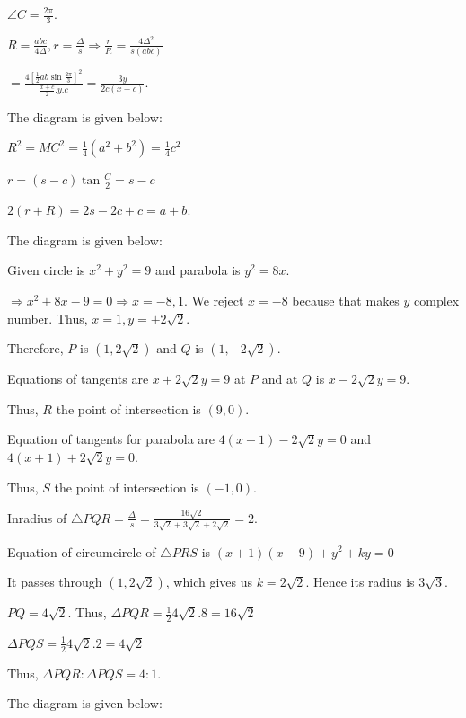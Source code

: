   $\angle C = \frac{2\pi}{3}$.

  $R = \frac{abc}{4\Delta}, r = \frac{\Delta}{s}\Rightarrow \frac{r}{R} = \frac{4\Delta^2}{s(abc)}$

  $= \frac{4\left[\frac{1}{2}ab\sin\frac{2\pi}{3}\right]^2}{\frac{x + c}{2}.y.c} = \frac{3y}{2c(x + c)}$.
\item The diagram is given below:

  \startplacefigure
    \externalfigure[17_21.pdf]
  \stopplacefigure

  $R^2 = MC^2 = \frac{1}{4}(a^2 + b^2) = \frac{1}{4}c^2$

  $r = (s - c)\tan\frac{C}{2}= s - c$

  $2(r + R) = 2s - 2c + c = a + b$.
\item The diagram is given below:

  \startplacefigure
    \externalfigure[17_22.pdf]
  \stopplacefigure

  Given circle is $x^2 + y^2 = 9$ and parabola is $y^2 = 8x$.

  $\Rightarrow x^2 + 8x - 9 = 0 \Rightarrow x = -8, 1$. We reject $x = -8$ because that makes $y$ complex
  number. Thus, $x = 1, y = \pm2\sqrt{2}$.

  Therefore, $P$ is $\left(1, 2\sqrt{2}\right)$ and $Q$ is $\left(1, -2\sqrt{2}\right)$.

  Equations of tangents are $x + 2\sqrt{2}y = 9$ at $P$ and at $Q$ is $x - 2\sqrt{2}y = 9$.

  Thus, $R$ the point of intersection is $(9, 0)$.

  Equation of tangents for parabola are $4(x + 1) - 2\sqrt{2}y = 0$ and $4(x + 1) + 2\sqrt{2}y = 0$.

  Thus, $S$ the point of intersection is $(-1, 0)$.

  Inradius of $\triangle PQR = \frac{\Delta}{s} = \frac{16\sqrt{2}}{3\sqrt{2} + 3\sqrt{2} + 2\sqrt{2}} = 2$.

  Equation of circumcircle of $\triangle PRS$ is $(x + 1)(x - 9) + y^2 + ky = 0$

  It passes through $\left(1, 2\sqrt{2}\right)$, which gives us $k = 2\sqrt{2}$. Hence its radius is
  $3\sqrt{3}$.

  $PQ = 4\sqrt{2}$. Thus, $\Delta PQR = \frac{1}{2}4\sqrt{2}.8 = 16\sqrt{2}$

  $\Delta PQS = \frac{1}{2}4\sqrt{2}.2 = 4\sqrt{2}$

  Thus, $\Delta PQR:\Delta PQS = 4:1$.
\item The diagram is given below:

